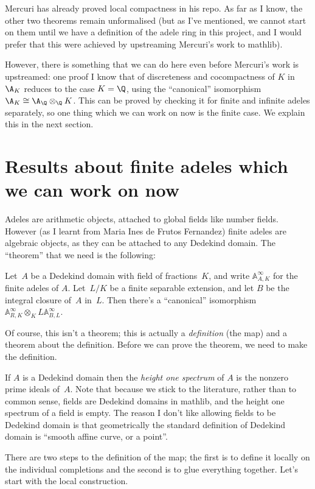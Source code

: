 Mercuri has already proved local compactness in his repo.
As far as I know, the other
two theorems remain unformalised (but as I've mentioned, we cannot start on them until
we have a definition of the adele ring in this project, and I would prefer
that this were achieved by upstreaming Mercuri's work to mathlib).

However, there is something that we can do here even before Mercuri's work
is upstreamed: one proof I know that of discreteness
and cocompactness of $K$ in $\A_K$ reduces to the case $K=\Q$, using the ``canonical''
isomorphism $\A_K\cong\A_{\Q}\otimes_{\Q}K$. This can be proved by checking it for finite
and infinite adeles separately, so one thing which we can work on now is the finite case.
We explain this in the next section.

\section{Results about finite adeles which we can work on now}

Adeles are arithmetic objects, attached to global fields like number fields.
However (as I learnt from Maria Ines de Frutos Fernandez) finite adeles are algebraic
objects, as they can be attached to any Dedekind domain. The ``theorem'' that we need
is the following:

\begin{theorem}
  Let~$A$ be a Dedekind domain with field of fractions~$K$, and write $\mathbb{A}_{A,K}^\infty$
  for the finite adeles of $A$. Let~$L/K$ be a finite
  separable extension, and let $B$ be the integral closure of~$A$ in~$L$.
  Then there's a ``canonical'' isomorphism $\mathbb{A}_{R,K}^\infty \otimes_KL\mathbb{A}_{B,L}^\infty$.
\end{theorem}

Of course, this isn't a theorem; this is actually a \emph{definition} (the map) and a theorem about
the definition. Before we can prove the theorem, we need to make the definition.

If $A$ is a Dedekind domain then the \emph{height one spectrum} of $A$ is
the nonzero prime ideals of~$A$. Note that because we stick to the literature,
rather than to common sense, fields are Dedekind domains in mathlib, and the
height one spectrum of a field is empty. The reason I don't like allowing fields
to be Dedekind domain is that geometrically the standard definition of Dedekind
domain is ``smooth affine curve, or a point''.

There are two steps to the definition of the map; the first is to define it locally
on the individual completions and the second is to glue everything together. Let's
start with the local construction.

